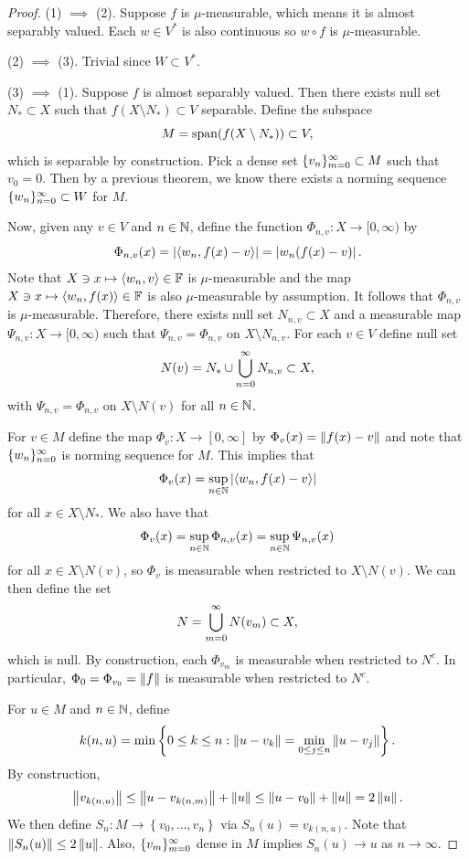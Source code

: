 \documentclass[a4paper]{article}
\begin{document}
\begin{proof}
  (1) $\implies$ (2). Suppose $f$ is $\mu$-measurable,
  which means it is almost separably valued.
  Each $w \in V^*$ is also continuous so
  $w \circ f$ is $\mu$-measurable.

  (2) $\implies$ (3). Trivial since $W \subset V^*$.

  (3) $\implies$ (1). Suppose $f$ is almost separably valued.
  Then there exists null set $N_* \subset X$ such that
  $f(X \setminus N_*) \subset V$ separable. Define the subspace
  \[
  M = \operatorname{span}(f(X \setminus N_*)) \subset V,
  \]
  which is separable by construction. Pick a dense
  set $\{ v_n \}_{m=0}^\infty \subset M$ such that $v_0 = 0$.
  Then by a previous theorem, we know there exists
  a norming sequence $\{ w_n \}_{n=0}^\infty \subset W$ for $M$.

  Now, given any $v \in V$ and $n \in \mathbb{N}$, define
  the function $\Phi_{n, v} : X \to [0, \infty)$
  by
  \[
  \Phi_{n, v}(x) = \left\lvert \left\langle w_n, f(x) - v \right\rangle\right\rvert
  = \left\lvert w_n(f(x) - v)\right\rvert.
  \]
  Note that $X \ni x \mapsto \left\langle w_n, v \right\rangle \in \mathbb{F}$ is
  $\mu$-measurable and the map $X \ni x \mapsto
  \left\langle w_n, f(x) \right\rangle \in \mathbb{F}$ is also $\mu$-measurable
  by assumption. It follows that
  $\Phi_{n, v}$ is $\mu$-measurable. Therefore,
  there exists null set $N_{n, v} \subset X$ and
  a measurable map $\Psi_{n, v} : X \to [0, \infty)$
  such that $\Psi_{n, v} = \Phi_{n, v}$ on $X \setminus
  N_{n, v}$. For each $v \in V$ define null set
  \[
  N(v) = N_* \cup \bigcup_{n=0}^\infty N_{n, v} \subset X,
  \]
  with $\Psi_{n, v} = \Phi_{n, v}$ on $X \setminus N(v)$
  for all $n \in \mathbb{N}$.

  For $v \in M$ define the map $\Phi_v : X \to [0, \infty]$
  by $\Phi_v(x) = \left\lVert f(x) - v\right\rVert$ and note that
  $\{ w_n \}_{n=0}^\infty$ is norming sequence for $M$.
  This implies that
  \[
  \Phi_v(x) = \sup_{n \in \mathbb{N}} \left\lvert \left\langle w_n, f(x) - v \right\rangle\right\rvert
  \]
  for all $x \in X \setminus N_*$. We also have that
  \[
  \Phi_v(x) = \sup_{n \in \mathbb{N}} \Phi_{n, v}(x)
  = \sup_{n \in \mathbb{N}} \Psi_{n, v}(x)
  \]
  for all $x \in X \setminus N(v)$, so $\Phi_v$
  is measurable when restricted to $X \setminus N(v)$.
  We can then define the set
  \[
  N = \bigcup_{m=0}^\infty N(v_m) \subset X,
  \]
  which is null. By construction, each $\Phi_{v_m}$
  is measurable when restricted to $N^c$.
  In particular, $\Phi_0 = \Phi_{v_0} = \left\lVert f\right\rVert$
  is measurable when restricted to $N^c$.

  For $u \in M$ and $n \in \mathbb{N}$, define
  \[
  k(n, u) = \min \left\{ 0 \leq k \leq n :
  \left\lVert u - v_k\right\rVert = \min_{0 \leq j \leq n}
  \left\lVert u - v_j\right\rVert \right\}.
  \]
  By construction,
  \[
  \left\lVert v_{k(n, u)}\right\rVert
  \leq \left\lVert u - v_{k(n, m)}\right\rVert + \left\lVert u\right\rVert
  \leq \left\lVert u - v_0\right\rVert + \left\lVert u\right\rVert
  = 2\left\lVert u\right\rVert.
  \]
  We then define $S_n: M \to \left\{ v_0, \dots, v_n
  \right\}$ via $S_n(u) = v_{k(n, u)}$. Note that
  $\left\lVert S_n(u)\right\rVert \leq 2 \left\lVert u\right\rVert$. Also,
  $\{ v_m \}_{m=0}^\infty$ dense in $M$ implies
  $S_n(u) \to u$ as $n \to \infty$.


\end{proof}
\end{document}
